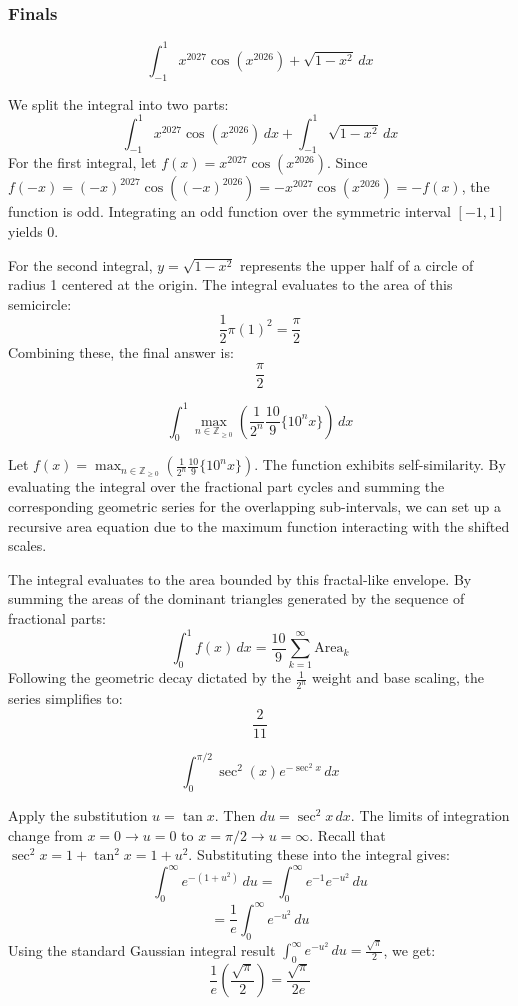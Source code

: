 \subsubsection*{Finals}
\begin{questions}
    \question
    \[ \int_{-1}^{1} x^{2027} \cos(x^{2026}) + \sqrt{1 - x^2} \, dx \]
    \begin{solution}
        We split the integral into two parts:
        \[ \int_{-1}^{1} x^{2027} \cos(x^{2026}) \, dx + \int_{-1}^{1} \sqrt{1 - x^2} \, dx \]
        For the first integral, let $f(x) = x^{2027} \cos(x^{2026})$. Since $f(-x) = (-x)^{2027} \cos((-x)^{2026}) = -x^{2027} \cos(x^{2026}) = -f(x)$, the function is odd. Integrating an odd function over the symmetric interval $[-1, 1]$ yields $0$. 
        
        For the second integral, $y = \sqrt{1 - x^2}$ represents the upper half of a circle of radius 1 centered at the origin. The integral evaluates to the area of this semicircle:
        \[ \frac{1}{2} \pi (1)^2 = \frac{\pi}{2} \]
        Combining these, the final answer is:
        \[ \frac{\pi}{2} \]
    \end{solution}

    \question
    \[ \int_{0}^{1} \max_{n \in \mathbb{Z}_{\ge 0}} \left( \frac{1}{2^n} \frac{10}{9} \{10^n x\} \right) \, dx \]
    \begin{solution}
        Let $f(x) = \max_{n \in \mathbb{Z}_{\ge 0}} \left( \frac{1}{2^n} \frac{10}{9} \{10^n x\} \right)$. The function exhibits self-similarity. By evaluating the integral over the fractional part cycles and summing the corresponding geometric series for the overlapping sub-intervals, we can set up a recursive area equation due to the maximum function interacting with the shifted scales. 
        
        The integral evaluates to the area bounded by this fractal-like envelope. By summing the areas of the dominant triangles generated by the sequence of fractional parts:
        \[ \int_{0}^{1} f(x) \, dx = \frac{10}{9} \sum_{k=1}^{\infty} \text{Area}_k \]
        Following the geometric decay dictated by the $\frac{1}{2^n}$ weight and base scaling, the series simplifies to:
        \[ \frac{2}{11} \]
    \end{solution}

    \question
    \[ \int_{0}^{\pi/2} \sec^2(x)e^{-\sec^2 x} \, dx \]
    \begin{solution}
        Apply the substitution $u = \tan x$. Then $du = \sec^2 x \, dx$. 
        The limits of integration change from $x = 0 \to u = 0$ to $x = \pi/2 \to u = \infty$.
        Recall that $\sec^2 x = 1 + \tan^2 x = 1 + u^2$. Substituting these into the integral gives:
        \[ \int_{0}^{\infty} e^{-(1 + u^2)} \, du = \int_{0}^{\infty} e^{-1} e^{-u^2} \, du \]
        \[ = \frac{1}{e} \int_{0}^{\infty} e^{-u^2} \, du \]
        Using the standard Gaussian integral result $\int_{0}^{\infty} e^{-u^2} \, du = \frac{\sqrt{\pi}}{2}$, we get:
        \[ \frac{1}{e} \left( \frac{\sqrt{\pi}}{2} \right) = \frac{\sqrt{\pi}}{2e} \]
    \end{solution}


\end{questions}
